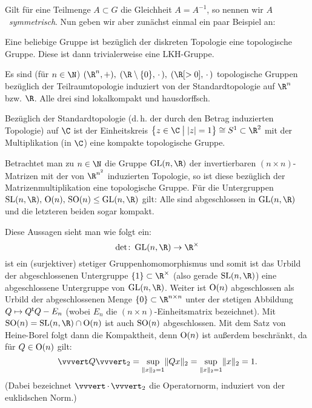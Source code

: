 Gilt für eine Teilmenge $A\subset G$ die Gleichheit $A=A^{-1}$, so nennen wir
$A$~\emph{symmetrisch}. Nun geben wir aber zunächst einmal ein paar Beispiel an:
\begin{BspList}
\item
    Eine beliebige Gruppe ist bezüglich der diskreten Topologie eine
    topologische Gruppe. Diese ist dann trivialerweise eine LKH-Gruppe.
    
\item
    Es sind (für $n\in\N$) $(\R^n,+),\; (\R\setminus\{0\}, \,\cdot\,),\; 
    (\R[>0], \,\cdot\,)$ topologische Gruppen bezüglich der Teilraumtopologie
    induziert von der Standardtopologie auf $\R^n$ bzw. $\R$. Alle drei sind
    lokalkompakt und hausdorffsch.

\item
    Bezüglich der Standardtopologie (d.\,h. der durch den Betrag induzierten
    Topologie) auf $\C$ ist der Einheitskreis 
    $\left\{ z\in\C \;\big\vert\; \abs{z}=1 \right\} \cong S^1 \subset \R^2$ mit
    der Multiplikation (in $\C$) eine kompakte topologische Gruppe.

\item
    Betrachtet man zu $n\in\N$ die Gruppe $\matGL(n,\R)$ der
    invertierbaren $(n\!\times\!n)$-Matrizen mit der von $\R^{n^2}$ induzierten
    Topologie, so ist diese bezüglich der Matrizenmultiplikation eine
    topologische Gruppe. Für die Untergruppen $\matSL(n,\R),\,\matO(n),\,\matSO(n)
    \leq \matGL(n,\R)$ gilt: Alle sind abgeschlossen in $\matGL(n,\R)$ und
    die letzteren beiden sogar kompakt.
    
    Diese Aussagen sieht man wie folgt ein:
    \[ \det\colon\matGL(n,\R)\to\R^\times 
    \] 
    ist ein (surjektiver) stetiger Gruppenhomomorphismus und somit ist das
    Urbild der abgeschlossenen Untergruppe $\{1\} \subset \R^\times$ (also
    gerade $\matSL(n,\R)$) eine abgeschlossene Untergruppe von $\matGL(n,\R)$.
    Weiter ist $\operatorname{O}(n)$ abgeschlossen als Urbild der abgeschlossenen Menge
    $\{0\} \subset \R^{n\times n}$ unter der stetigen Abbildung $Q\mapsto Q^\mathsf{t} Q - E_n$
    (wobei $E_n$ die $(n\!\times\!n)$-Einheitsmatrix bezeichnet). Mit $\matSO(n)
    = \matSL(n,\R) \cap \matO(n)$ ist auch $\operatorname{SO}(n)$ abgeschlossen.
    Mit dem Satz von Heine-Borel folgt dann die Kompaktheit, denn $\operatorname{O}(n)$ ist
    außerdem beschränkt, da für $Q\in\operatorname{O}(n)$ gilt: 
    \[ \opnorm{Q}_2 = \sup_{\norm{x}_2=1} \norm{Qx}_2 
        = \sup_{\norm{x}_2=1} \norm{x}_2 = 1
    . \]
    (Dabei bezeichnet $\opnorm{\,\cdot\,}_2$ die Operatornorm, induziert von der
    euklidschen Norm.)
    

\end{BspList}
